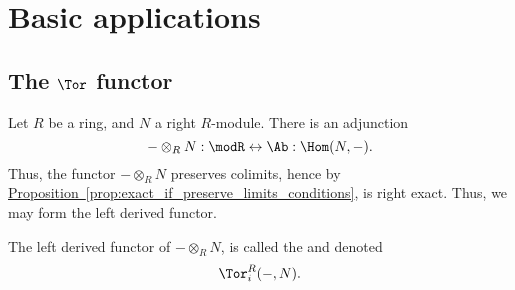 \documentclass[main.tex]{subfiles}
\begin{document}
\chapter{Basic applications}
\label{ch:basic_applications}


\section{The \texorpdfstring{$\Tor$}{Tor} functor}
\label{sec:tor}

Let $R$ be a ring, and $N$ a right $R$-module. There is an adjunction
\begin{equation*}
  - \otimes_{R} N : \modR \leftrightarrow \Ab : \Hom(N, -).
\end{equation*}
Thus, the functor $- \otimes_{R} N$ preserves colimits, hence by \hyperref[prop:exact_if_preserve_limits_conditions]{Proposition~\ref*{prop:exact_if_preserve_limits_conditions}}, is right exact. Thus, we may form the left derived functor.

\begin{definition}
  \label{def:tor_functor}
  The left derived functor of $- \otimes_{R} N$, is called the  and denoted
  \begin{equation*}
    \Tor_{i}^{R}(-, N).
  \end{equation*}
\end{definition}
\end{document}
